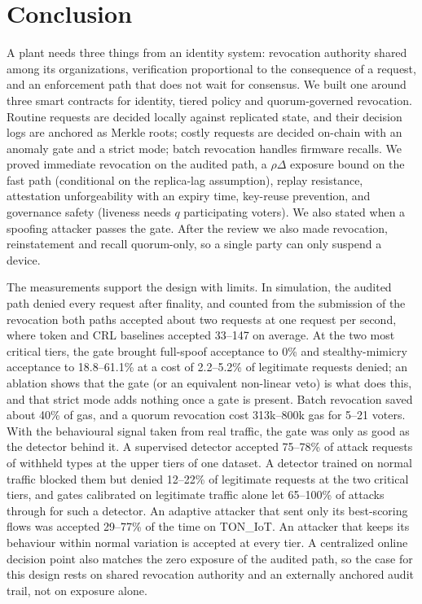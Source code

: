 \section{Conclusion}\label{sec:concl}
A plant needs three things from an identity system: revocation authority shared among its organizations, verification proportional to the consequence of a request, and an enforcement path that does not wait for consensus. We built one around three smart contracts for identity, tiered policy and quorum-governed revocation. Routine requests are decided locally against replicated state, and their decision logs are anchored as Merkle roots; costly requests are decided on-chain with an anomaly gate and a strict mode; batch revocation handles firmware recalls. We proved immediate revocation on the audited path, a $\rho\Delta$ exposure bound on the fast path (conditional on the replica-lag assumption), replay resistance, attestation unforgeability with an expiry time, key-reuse prevention, and governance safety (liveness needs $q$ participating voters). We also stated when a spoofing attacker passes the gate. After the review we also made revocation, reinstatement and recall quorum-only, so a single party can only suspend a device.

The measurements support the design with limits. In simulation, the audited path denied every request after finality, and counted from the submission of the revocation both paths accepted about two requests at one request per second, where token and CRL baselines accepted 33--147 on average. At the two most critical tiers, the gate brought full-spoof acceptance to 0\% and stealthy-mimicry acceptance to 18.8--61.1\% at a cost of 2.2--5.2\% of legitimate requests denied; an ablation shows that the gate (or an equivalent non-linear veto) is what does this, and that strict mode adds nothing once a gate is present. Batch revocation saved about 40\% of gas, and a quorum revocation cost 313k--800k gas for 5--21 voters. With the behavioural signal taken from real traffic, the gate was only as good as the detector behind it. A supervised detector accepted 75--78\% of attack requests of withheld types at the upper tiers of one dataset. A detector trained on normal traffic blocked them but denied 12--22\% of legitimate requests at the two critical tiers, and gates calibrated on legitimate traffic alone let 65--100\% of attacks through for such a detector. An adaptive attacker that sent only its best-scoring flows was accepted 29--77\% of the time on TON\_IoT. An attacker that keeps its behaviour within normal variation is accepted at every tier. A centralized online decision point also matches the zero exposure of the audited path, so the case for this design rests on shared revocation authority and an externally anchored audit trail, not on exposure alone.

